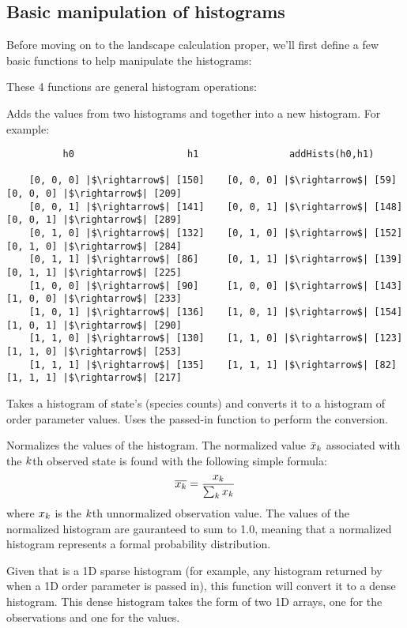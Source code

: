 
\subsection{Basic manipulation of histograms}

Before moving on to the landscape calculation proper, we'll first define a few basic functions to help manipulate the histograms:

These 4 functions are general histogram operations:
\begin{description}[style=nextline]
    \item[\code{addHists}]
        Adds the values from two histograms  and  together into a new histogram. For example:
\begin{verbatim}
          h0                    h1                addHists(h0,h1)

    [0, 0, 0] |$\rightarrow$| [150]    [0, 0, 0] |$\rightarrow$| [59]      [0, 0, 0] |$\rightarrow$| [209]
    [0, 0, 1] |$\rightarrow$| [141]    [0, 0, 1] |$\rightarrow$| [148]     [0, 0, 1] |$\rightarrow$| [289]
    [0, 1, 0] |$\rightarrow$| [132]    [0, 1, 0] |$\rightarrow$| [152]     [0, 1, 0] |$\rightarrow$| [284]
    [0, 1, 1] |$\rightarrow$| [86]     [0, 1, 1] |$\rightarrow$| [139]     [0, 1, 1] |$\rightarrow$| [225]
    [1, 0, 0] |$\rightarrow$| [90]     [1, 0, 0] |$\rightarrow$| [143]     [1, 0, 0] |$\rightarrow$| [233]
    [1, 0, 1] |$\rightarrow$| [136]    [1, 0, 1] |$\rightarrow$| [154]     [1, 0, 1] |$\rightarrow$| [290]
    [1, 1, 0] |$\rightarrow$| [130]    [1, 1, 0] |$\rightarrow$| [123]     [1, 1, 0] |$\rightarrow$| [253]
    [1, 1, 1] |$\rightarrow$| [135]    [1, 1, 1] |$\rightarrow$| [82]      [1, 1, 1] |$\rightarrow$| [217]
\end{verbatim}
    \item[\code{calcOParamHist}]
        Takes a histogram of state's (\ie species counts) and converts it to a histogram of order parameter values. Uses the passed-in function  to perform the conversion.
    \item[\code{normHist}]
        Normalizes the values of the histogram. The normalized value $\bar{x}_{k}$ associated with the $k$th observed state is found with the following simple formula:
        \begin{equation}
            \overline{x_{k}} = \frac{x_{k}}{\sum_{k} x_{k}}
        \end{equation}
        where $x_{k}$ is the $k$th unnormalized observation value. The values of the normalized histogram are gauranteed to sum to 1.0, meaning that a normalized histogram represents a formal probability distribution.
    \item[\code{sparseToDense1D}] Given that  is a 1D sparse histogram (for example, any histogram returned by  when a 1D order parameter is passed in), this function will convert it to a dense histogram. This dense histogram takes the form of two 1D arrays, one for the observations and one for the values.
\end{description}

